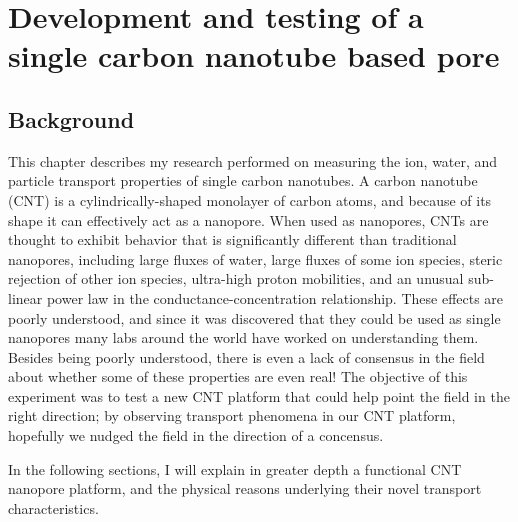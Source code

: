 \graphicspath{{../images/ch2/}}	%


\chapter{Development and testing of a single carbon nanotube based pore}
\label{chap:cnt}
	

	\section{Background}
	
		This chapter describes my research performed on measuring the ion, water, and particle transport properties of single carbon nanotubes. A carbon nanotube (CNT) is a cylindrically-shaped monolayer of carbon atoms, and because of its shape it can effectively act as a nanopore.  When used as nanopores, CNTs are thought to exhibit behavior that is significantly different than traditional nanopores, including large fluxes of water, large fluxes of some ion species, steric rejection of other ion species, ultra-high proton mobilities, and an unusual sub-linear power law in the conductance-concentration relationship. These effects are poorly understood, and since it was discovered that they could be used as single nanopores many labs around the world have worked on understanding them. Besides being poorly understood, there is even a lack of consensus in the field about whether some of these properties are even real! The objective of this experiment was to test a new CNT platform that could help point the field in the right direction; by observing transport phenomena in our CNT platform, hopefully we nudged the field in the direction of a concensus. 
		
		In the following sections, I will explain in greater depth a functional CNT nanopore platform, and the physical reasons underlying their novel transport characteristics.
		
		
		
	

	




